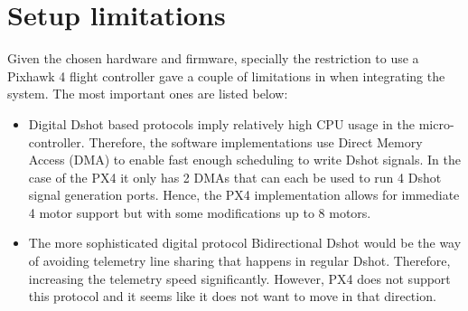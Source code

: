 \section{Setup limitations}
Given the chosen hardware and firmware, specially the restriction to use a Pixhawk 4 flight controller gave a couple of limitations in when integrating the system. The most important ones are listed below:
\begin{itemize}
	\item Digital Dshot based protocols imply relatively high CPU usage in the micro-controller. Therefore, the software implementations use Direct Memory Access (DMA) to enable fast enough scheduling to write Dshot signals. In the case of the PX4 it only has 2 DMAs that can each be used to run 4 Dshot signal generation ports. Hence, the PX4 implementation allows for immediate 4 motor support but with some modifications up to 8 motors.

	\item The more sophisticated digital protocol Bidirectional Dshot would be the way of avoiding telemetry line sharing that happens in regular Dshot. Therefore, increasing the telemetry speed significantly. However, PX4 does not support this protocol and it seems like it does not want to move in that direction.



\end{itemize}

